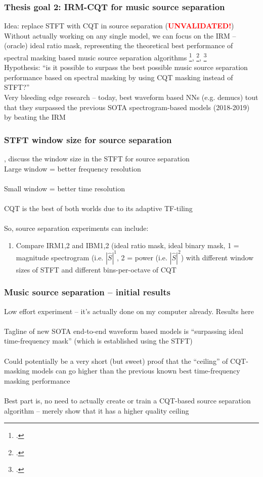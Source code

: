 \documentclass[usenames,dvipsnames]{beamer}
\begin{document}
\begin{frame}
	\frametitle{Thesis goal 2: IRM-CQT for music source separation}
	Idea: replace STFT with CQT in source separation (\textcolor{red}{\textbf{UNVALIDATED!}})\\
	\vspace{0.5em}
	Without actually working on any single model, we can focus on the IRM -- (oracle) ideal ratio mask, representing the theoretical  best performance of spectral masking based music source separation algorithms \footcite{irm}, \footcite{sigsep2018}, \footcite{vincent07}\\
	\vspace{0.5em}
	Hypothesis: ``is it possible to surpass the best possible music source separation performance based on spectral masking by using CQT masking instead of STFT?''\\
	\vspace{0.5em}
	Very bleeding edge research -- today, best waveform based NNs (e.g. demucs) tout that they surpassed the previous SOTA spectrogram-based models (2018-2019) by beating the IRM
\end{frame}

\begin{frame}
	\frametitle{STFT window size for source separation}
	\textcite{tftradeoff1}, \textcite{tftradeoff2} discuss the window size in the STFT for source separation\\
	Large window = better frequency resolution\\\ \\
	Small window = better time resolution\\\ \\
	CQT is the best of both worlds due to its adaptive TF-tiling\\\ \\
	So, source separation experiments can include:
	\begin{enumerate}
		\item
			Compare IRM1,2 and IBM1,2 (ideal ratio mask, ideal binary mask, 1 = magnitude spectrogram (i.e. $|\hat{S}|^{1}$, 2 = power (i.e. $|\hat{S}|^{2}$) with different window sizes of STFT and different bins-per-octave of CQT
	\end{enumerate}
\end{frame}

\begin{frame}
	\frametitle{Music source separation -- initial results}
	Low effort experiment -- it's actually done on my computer already. Results here\\\ \\
	Tagline of new SOTA end-to-end waveform based models is ``surpassing ideal time-frequency mask'' (which is established using the STFT)\\\ \\
	Could potentially be a very short (but sweet) proof that the ``ceiling'' of CQT-masking models can go higher than the previous known best time-frequency masking performance\\\  \\
	Best part is, no need to actually create or train a CQT-based source separation algorithm -- merely show that it has a higher quality ceiling
\end{frame}
\end{document}
